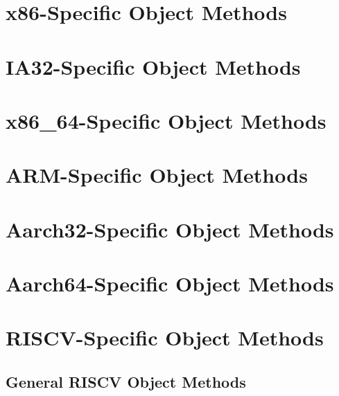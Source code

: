 \clearpage

\section{x86-Specific Object Methods}
\clearpage

\section{IA32-Specific Object Methods}
\clearpage

\section{x86\_64-Specific Object Methods}

\fi

\clearpage

\section{ARM-Specific Object Methods}

\clearpage

\section{Aarch32-Specific Object Methods}
\clearpage

\section{Aarch64-Specific Object Methods}
\clearpage

\section{RISCV-Specific Object Methods}
\subsection{General RISCV Object Methods}
